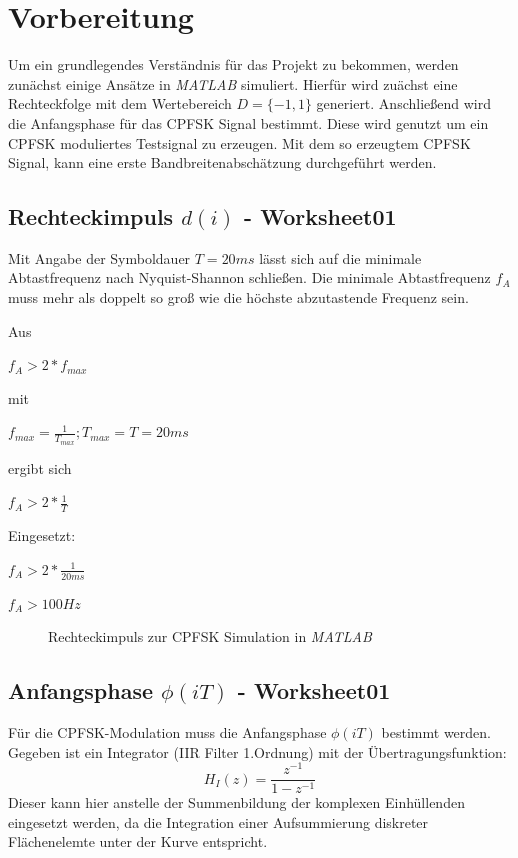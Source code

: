 \documentclass{article}
\begin{document}
\section{Vorbereitung}
Um ein grundlegendes Verständnis für das Projekt zu bekommen, werden zunächst einige Ansätze in \textit{MATLAB} simuliert.
Hierfür wird zuächst eine Rechteckfolge mit dem Wertebereich $D = \{-1,1\}$ generiert. Anschließend wird die Anfangsphase für das CPFSK Signal bestimmt. Diese wird genutzt um ein 
\ac{CPFSK} moduliertes Testsignal zu erzeugen. Mit dem so erzeugtem CPFSK Signal, kann eine erste Bandbreitenabschätzung durchgeführt werden.


\subsection{Rechteckimpuls $d(i)$ - Worksheet01}\label{sec:rechteck}
Mit Angabe der Symboldauer $T = 20ms$ lässt sich auf die minimale Abtastfrequenz nach Nyquist-Shannon schließen.
Die minimale Abtastfrequenz $f_A$ muss mehr als doppelt so groß wie die höchste abzutastende Frequenz sein.

Aus
\begin{center}
 $
f_A > 2*f_{max}
$
\end{center}

mit 
\begin{center} $f_{max} = \frac{1}{T_{max}} ; T_{max} = T = 20ms$  \end{center}

ergibt sich

\begin{center}
$
f_A > 2*\frac{1}{T}
$
\end{center}

Eingesetzt:
\begin{center}
$f_A > 2*\frac{1}{20ms}$
\end{center}
\begin{center}
$f_A > 100Hz$   
\end{center}
\begin{figure}[!h]
    \centering
    \def\svgscale{0.3}
    \def\svgwidth{\columnwidth}
    
    \caption{Rechteckimpuls zur \ac{CPFSK} Simulation in \textit{MATLAB}}
\end{figure}

\subsection{Anfangsphase $\phi(iT)$ - Worksheet01}
Für die \ac{CPFSK}-Modulation muss die Anfangsphase $\phi(iT)$ bestimmt werden.
Gegeben ist ein Integrator (IIR Filter 1.Ordnung) mit der Übertragungsfunktion:
$$
H_I(z)=\frac{z^{-1}}{1-z^{-1}}
$$
Dieser kann hier anstelle der Summenbildung der komplexen Einhüllenden eingesetzt werden, 
da die Integration einer Aufsummierung diskreter Flächenelemte unter der Kurve entspricht.
\end{document}
